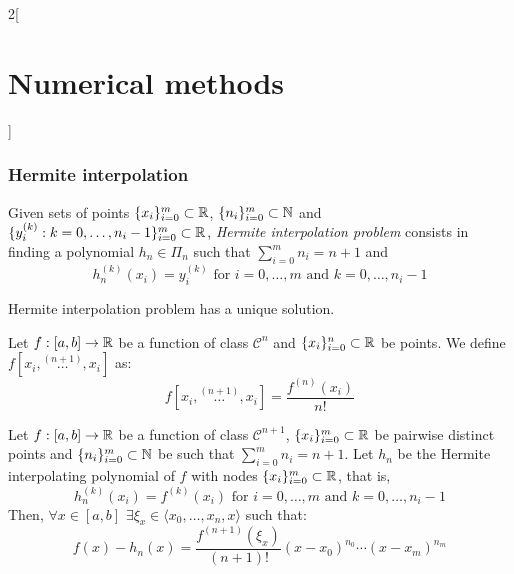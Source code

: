 \documentclass[../../../main_math.tex]{subfiles}
\begin{document}
\begin{multicols}{2}[\section{Numerical methods}]
  \subsubsection{Hermite interpolation}
  \begin{definition}
    Given sets of points $\{x_i\}_{i=0}^m\subset\mathbb{R}$, $\{n_i\}_{i=0}^m\subset\mathbb{N}$ and $\{y_i^{(k)}:k=0,\ldots,n_i-1\}_{i=0}^m\subset\mathbb{R}$, \emph{Hermite interpolation problem} consists in finding a polynomial $h_n\in\Pi_n$ such that $\sum_{i=0}^mn_i=n+1$ and $$h_n^{(k)}(x_i)=y_i^{(k)}\text{ for }i=0,\ldots,m\text{ and }k=0,\ldots,n_i-1$$
  \end{definition}
  \begin{proposition}
    Hermite interpolation problem has a unique solution.
  \end{proposition}
  \begin{definition}
    Let $f:[a,b]\rightarrow\mathbb{R}$ be a function of class $\mathcal{C}^n$ and $\{x_i\}_{i=0}^n\subset\mathbb{R}$ be points. We define $f[x_i,\overset{(n+1)}{\ldots},x_i]$ as: $$f[x_i,\overset{(n+1)}{\ldots},x_i]=\frac{f^{(n)}(x_i)}{n!}$$
  \end{definition}
  \begin{theorem}
    Let $f:[a,b]\rightarrow\mathbb{R}$ be a function of class $\mathcal{C}^{n+1}$, $\{x_i\}_{i=0}^m\subset\mathbb{R}$ be pairwise distinct points and $\{n_i\}_{i=0}^m\subset\mathbb{N}$ be such that $\sum_{i=0}^mn_i=n+1$. Let $h_n$ be the Hermite interpolating polynomial of $f$ with nodes $\{x_i\}_{i=0}^m\subset\mathbb{R}$, that is, $$h_n^{(k)}(x_i)=f^{(k)}(x_i)\text{ for }i=0,\ldots,m\text{ and }k=0,\ldots,n_i-1$$ Then, $\forall x\in[a,b]$ $\exists\xi_x\in\langle x_0,\ldots,x_n,x\rangle$ such that: $$f(x)-h_n(x)=\frac{f^{(n+1)}(\xi_x)}{(n+1)!}(x-x_0)^{n_0}\cdots(x-x_m)^{n_m}$$
  \end{theorem}

\end{multicols}
\end{document}

